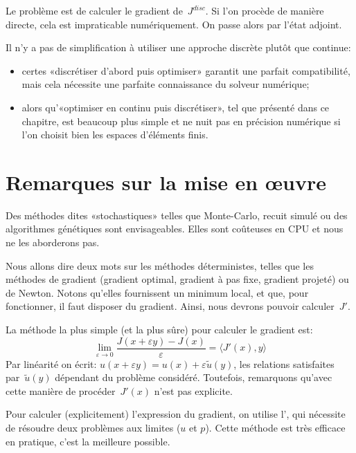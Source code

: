 Le problème est de calculer le gradient de~$J^{disc}$. Si l'on procède de manière directe, cela est impraticable numériquement. On passe alors par l'état adjoint.

\medskip
Il n'y a pas de simplification à utiliser une approche discrète plutôt que continue:
\begin{itemize}
   \item certes «discrétiser d'abord puis optimiser» garantit une parfait compatibilité, mais cela nécessite une parfaite connaissance du solveur numérique;
   \item alors qu'«optimiser en continu puis discrétiser», tel que présenté dans ce chapitre, est beaucoup plus simple et ne nuit pas en précision numérique si l'on choisit bien les espaces d'éléments finis.
\end{itemize}


\medskip
\section{Remarques sur la mise en œuvre}

Des méthodes dites «stochastiques» telles que Monte-Carlo, recuit simulé ou des algorithmes génétiques sont envisageables. Elles sont coûteuses en CPU et nous ne les aborderons pas.

Nous allons dire deux mots sur les méthodes déterministes, telles que les méthodes de gradient (gradient optimal, gradient à pas fixe, gradient projeté) ou de Newton. Notons qu'elles fournissent un minimum local, et que, pour fonctionner, il faut disposer du gradient. Ainsi, nous devrons pouvoir calculer~$J'$.

\medskip
La méthode la plus simple (et la plus sûre) pour calculer le gradient est:
\begin{equation}
\lim_{\varepsilon\rightarrow0} \dfrac{J(x+\varepsilon y)-J(x)}{\varepsilon}
=\langle J'(x),y\rangle %
\end{equation}
Par linéarité on écrit: $u(x+\varepsilon y)=u(x)+\varepsilon \tilde{u}(y)$, les relations satisfaites par~$\tilde{u}(y)$ dépendant du problème considéré.
Toutefois, remarquons qu'avec cette manière de procéder~$J'(x)$ n'est pas explicite.

\medskip
Pour calculer (explicitement) l'expression du gradient, on utilise l', qui nécessite de résoudre deux problèmes aux limites ($u$ et $p$).
Cette méthode est très efficace en pratique, c'est la meilleure possible.

